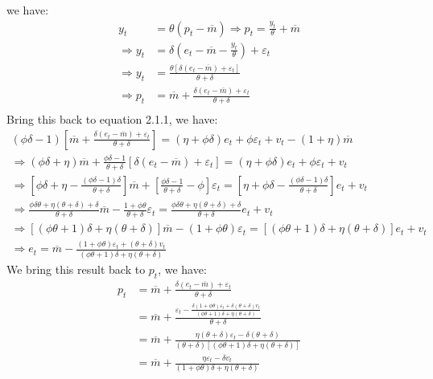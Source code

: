 \documentclass[a4paper,12pt]{article} %
\theoremstyle{nonitalic}
\begin{document}
we have:
\begin{align*}
    y_t &= \theta (p_t - \overline{m}) \Rightarrow p_t = \frac{y_t}{\theta} + \overline{m} \\
    \Rightarrow y_t &= \delta \left( e_t - \overline{m} - \frac{y_t}{\theta} \right) + \varepsilon_t \\
    \Rightarrow y_t &= \frac{\theta\left[\delta (e_t - \overline{m}) + \varepsilon_t \right]}{\theta + \delta} \\
    \Rightarrow p_t &= \overline{m} + \frac{\delta (e_t - \overline{m}) + \varepsilon_t}{\theta + \delta}  \\
\end{align*}
Bring this back to equation 2.1.1, we have:
\begin{gather*}
    (\phi \delta - 1) \left[ \overline{m} + \frac{\delta (e_t - \overline{m}) + \varepsilon_t}{\theta + \delta} \right] = (\eta + \phi \delta )e_t + \phi \varepsilon_t + v_t - (1 + \eta)\overline{m} \\
    \Rightarrow (\phi \delta + \eta) \overline{m} + \frac{\phi \delta - 1}{\theta + \delta} \left[ \delta (e_t - \overline{m}) + \varepsilon_t \right] = (\eta + \phi \delta )e_t + \phi \varepsilon_t + v_t \\
    \Rightarrow \left[ \phi \delta + \eta - \frac{(\phi \delta - 1) \delta}{\theta + \delta} \right] \overline{m} + \left[ \frac{\phi \delta - 1}{\theta + \delta} - \phi \right]\varepsilon_t = \left[ \eta + \phi \delta - \frac{(\phi \delta - 1) \delta}{\theta + \delta} \right]e_t + v_t \\
    \Rightarrow \frac{\phi \delta \theta + \eta (\theta + \delta) + \delta}{\theta + \delta} \overline{m} - \frac{1 + \phi \theta}{\theta + \delta} \varepsilon_t = \frac{\phi \delta \theta + \eta (\theta + \delta) + \delta }{\theta + \delta} e_t + v_t \\
    \Rightarrow \left[ (\phi \theta + 1)\delta + \eta (\theta + \delta) \right] \overline{m} - (1 + \phi \theta) \varepsilon_t = \left[ (\phi \theta + 1)\delta + \eta (\theta + \delta) \right] e_t + v_t \\
    \Rightarrow e_t = \overline{m} - \frac{(1 + \phi \theta)\varepsilon_t + (\theta + \delta)v_t}{(\phi \theta + 1)\delta + \eta (\theta + \delta)} \tag{2.1.2}
\end{gather*}
We bring this result back to $p_t$, we have:
\begin{align*}
    p_t &= \overline{m} + \frac{\delta (e_t - \overline{m}) + \varepsilon_t}{\theta + \delta} \\
        &= \overline{m} + \frac{ \varepsilon_t - \frac{\delta (1 + \phi \theta) \varepsilon_t + \delta(\theta + \delta)v_t}{(\phi \theta + 1)\delta + \eta (\theta + \delta)} }{\theta + \delta} \\
        &= \overline{m} + \frac{\eta (\theta + \delta)\varepsilon_t - \delta (\theta + \delta)}{(\theta + \delta) \left[ (\phi \theta + 1)\delta + \eta (\theta + \delta) \right]} \\
        &= \overline{m} + \frac{\eta \varepsilon_t - \delta v_t}{(1 + \phi \theta)\delta + \eta (\theta + \delta)} \tag{2.1.3}
\end{align*}
\end{document}
